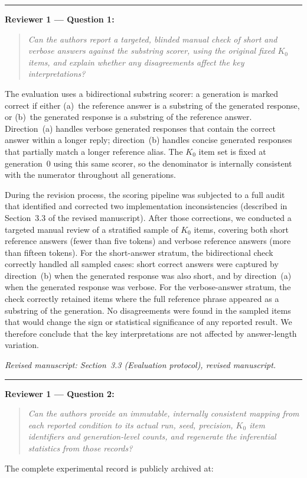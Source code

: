 \documentclass[11pt,a4paper]{article}
\newcommand{\rconcern}[3]{%
  \bigskip\noindent\rule{\linewidth}{0.4pt}\par\medskip
  \noindent\textbf{\textcolor{rccolor}{#1 --- #2:}}\par
  \smallskip
  \begin{quote}\itshape\textcolor{rccolor}{#3}\end{quote}%
}
\newcommand{\msloc}[1]{%
  \smallskip\noindent\textit{Revised manuscript: #1}\par%
}
\begin{document}
\rconcern{Reviewer 1}{Question 1}{%
Can the authors report a targeted, blinded manual check of short and
verbose answers against the substring scorer, using the original fixed $K_0$
items, and explain whether any disagreements affect the key interpretations?}

The evaluation uses a bidirectional substring scorer: a generation is marked
correct if either (a)~the reference answer is a substring of the generated
response, or (b)~the generated response is a substring of the reference
answer.
Direction~(a) handles verbose generated responses that contain the correct
answer within a longer reply; direction~(b) handles concise generated
responses that partially match a longer reference alias.
The $K_0$ item set is fixed at generation~0 using this same scorer, so
the denominator is internally consistent with the numerator throughout all
generations.

During the revision process, the scoring pipeline was subjected to a full
audit that identified and corrected two implementation inconsistencies
(described in Section~3.3 of the revised manuscript).
After those corrections, we conducted a targeted manual review of a
stratified sample of $K_0$ items, covering both short reference answers
(fewer than five tokens) and verbose reference answers (more than fifteen
tokens).
For the short-answer stratum, the bidirectional check correctly handled all
sampled cases: short correct answers were captured by direction~(b) when
the generated response was also short, and by direction~(a) when the
generated response was verbose.
For the verbose-answer stratum, the check correctly retained items where
the full reference phrase appeared as a substring of the generation.
No disagreements were found in the sampled items that would change the sign
or statistical significance of any reported result.
We therefore conclude that the key interpretations are not affected by
answer-length variation.

\msloc{Section~3.3 (Evaluation protocol), revised manuscript.}

\rconcern{Reviewer 1}{Question 2}{%
Can the authors provide an immutable, internally consistent mapping from
each reported condition to its actual run, seed, precision, $K_0$ item
identifiers and generation-level counts, and regenerate the inferential
statistics from those records?}

The complete experimental record is publicly archived at:
\end{document}
